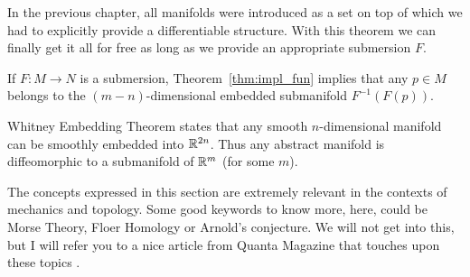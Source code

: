 In the previous chapter, all manifolds were introduced as a set on top of which we had to explicitly provide a differentiable structure. With this theorem we can finally get it all for free as long as we provide an appropriate submersion $F$.

\begin{remark}
  If $F:M\to N$ is a submersion, Theorem~\ref{thm:impl_fun} implies that any $p\in M$ belongs to the $(m-n)$-dimensional embedded submanifold $F^{-1}(F(p))$.
\end{remark}

%

\begin{remark}\label{rmk:WhitneyET}
  Whitney Embedding Theorem states that any smooth $n$-dimensional manifold can be smoothly embedded into $\mathbb{R}^{2n}$.
  Thus any abstract manifold is diffeomorphic to a submanifold of $\mathbb{R}^m$ (for some $m$).
\end{remark}

\begin{remark}
  The concepts expressed in this section are extremely relevant in the contexts of mechanics and topology.
  Some good keywords to know more, here, could be Morse Theory, Floer Homology or Arnold's conjecture.
  We will not get into this, but I will refer you to a nice article from Quanta Magazine that touches upon these topics \cite{article:quanta:floer}.
\end{remark}

